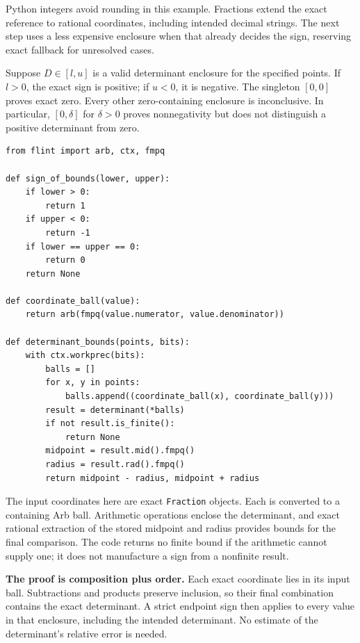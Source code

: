 Python integers avoid rounding in this example. Fractions extend the exact
reference to rational coordinates, including intended decimal strings.
The next step uses a less expensive enclosure when that already decides
the sign, reserving exact fallback for unresolved cases.

\newpage
{}
Suppose $D\in[l,u]$ is a valid determinant enclosure for the specified
points. If $l>0$, the exact sign is positive; if $u<0$, it is negative.
The singleton $[0,0]$ proves exact zero. Every other zero-containing
enclosure is inconclusive. In particular, $[0,\delta]$ for $\delta>0$
proves nonnegativity but does not distinguish a positive determinant from zero.
\begin{lstlisting}
from flint import arb, ctx, fmpq

def sign_of_bounds(lower, upper):
    if lower > 0:
        return 1
    if upper < 0:
        return -1
    if lower == upper == 0:
        return 0
    return None

def coordinate_ball(value):
    return arb(fmpq(value.numerator, value.denominator))

def determinant_bounds(points, bits):
    with ctx.workprec(bits):
        balls = []
        for x, y in points:
            balls.append((coordinate_ball(x), coordinate_ball(y)))
        result = determinant(*balls)
        if not result.is_finite():
            return None
        midpoint = result.mid().fmpq()
        radius = result.rad().fmpq()
        return midpoint - radius, midpoint + radius
\end{lstlisting}

The input coordinates here are exact \texttt{Fraction} objects. Each is
converted to a containing Arb ball. Arithmetic operations enclose the
determinant, and exact rational extraction of the stored midpoint and
radius provides bounds for the final comparison. The code returns no
finite bound if the arithmetic cannot supply one; it does not manufacture
a sign from a nonfinite result.

\textbf{The proof is composition plus order.} Each exact coordinate lies
in its input ball. Subtractions and products preserve inclusion, so their
final combination contains the exact determinant. A strict endpoint sign
then applies to every value in that enclosure, including the intended
determinant. No estimate of the determinant's relative error is needed.

